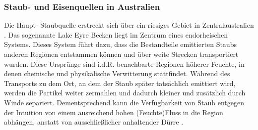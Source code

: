 \documentclass[12pt,a4paper,onecolumn,headheight=30pt]{scrartcl}
\begin{document}
\subsubsection{Staub- und Eisenquellen in Australien} \label{sec:staubquellen}
Die Haupt- Staubquelle erstreckt sich über ein riesiges Gebiet in Zentralaustralien \citep{Shao.2011}. Das sogenannte Lake Eyre Becken liegt im Zentrum eines endorheischen Systems. Dieses System führt dazu, dass die Bestandteile emittierten Staubs anderen Regionen entstammen können und über weite Strecken transportiert wurden. Diese Ursprünge sind i.d.R. benachbarte Regionen höherer Feuchte, in denen chemische und physikalische Verwitterung stattfindet. Während des Transports zu dem Ort, an dem der Staub später tatsächlich emittiert wird, werden die Partikel weiter zermahlen und dadurch kleiner und zusätzlich durch Winde separiert. Dementsprechend kann die Verfügbarkeit von Staub entgegen der Intuition von einem ausreichend hohen (Feuchte)Fluss in die Region abhängen, anstatt von ausschließlicher anhaltender Dürre \citep{Marx.2018}.
\end{document}
